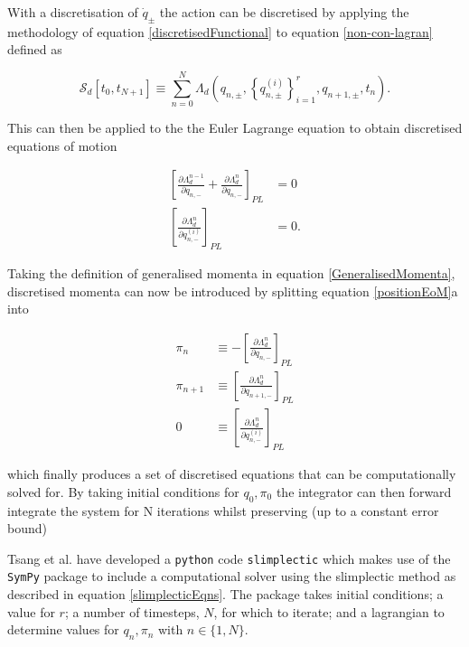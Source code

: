 \documentclass[10pt]{iopart}
\begin{document}
With a discretisation of $\dot{q}_{\pm}$ the action can be discretised by applying the methodology of equation \ref{discretisedFunctional} to equation \ref{non-con-lagran} defined as 


\begin{equation}
\mathcal{S}_d\left[t_0, t_{N+1}\right] \equiv \sum_{n=0}^N \Lambda_d\left(q_{n, \pm},\left\{q_{n, \pm}^{(i)}\right\}_{i=1}^r, q_{n+1, \pm}, t_n\right).
\end{equation}

This can then be applied to the the Euler Lagrange equation to obtain discretised equations of motion


\begin{subequations}
\label{positionEoM}
\begin{align}
		\left[\frac{\partial \Lambda_d^{n-1}}{\partial q_{n,-}} + \frac{\partial\Lambda_d^n}{\partial q_{n,-}}\right]_{PL} &= 0 \\
	\left[\frac{\partial\Lambda_d^n}{\partial q_{n,-}^{(i)}}\right]_{PL} &= 0.
\end{align}
\end{subequations}

Taking the definition of generalised momenta in equation \ref{GeneralisedMomenta}, discretised momenta can now be introduced by splitting equation \ref{positionEoM}a into 

\begin{subequations}
\label{slimplecticEqns}
\begin{align}
\pi_n &\equiv -\left[\frac{\partial\Lambda_d^n}{\partial q_{n,-}}\right]_{PL} \\
\pi_{n+1} &\equiv \left[\frac{\partial\Lambda_d^n}{\partial q_{n+1,-}}\right]_{PL} \\ 
0 &\equiv \left[\frac{\partial\Lambda_d^n}{\partial q_{n,-}^{(i)}}\right]_{PL}
\end{align}
\end{subequations}

which finally produces a set of discretised equations that can be computationally solved for. By taking initial conditions for $q_0, \pi_0$ the integrator can then forward integrate the system for N iterations whilst preserving (up to a constant error bound) 

Tsang et al. \cite{Tsang_Slimplectic} have developed a \texttt{python} code \texttt{slimplectic} which makes use of the \texttt{SymPy} package to include a computational solver using the slimplectic method as described in equation \ref{slimplecticEqns}. The package takes initial conditions; a value for $r$; a number of timesteps, $N$, for which to iterate; and a lagrangian to determine values for $q_n,\pi_n$ with $n\in\{1,N\}$.
\end{document}
